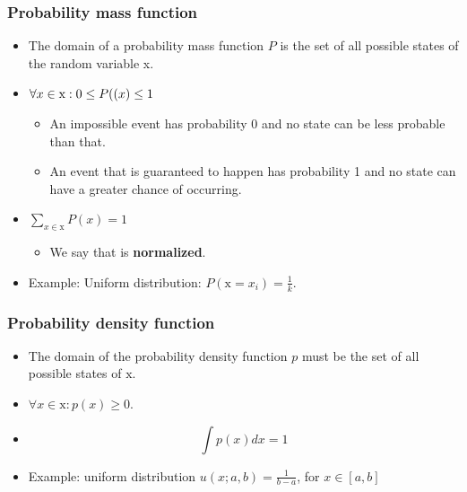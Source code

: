 \documentclass[notes]{beamer}          %
\begin{document}
\begin{frame}
\frametitle{Probability mass function}
\begin{itemize}
    \item The domain of a probability mass function $P$ is the set of all possible states of the random variable x.
    \item $\forall x \in \text{x}: 0 \leq P(\text(x) \leq 1$
        \begin{itemize}
            \item An impossible event has probability 0 and no state can be less probable than that.
            \item An event that is guaranteed to happen has probability 1 and no state can have a greater chance of occurring.
        \end{itemize}
    \item $\sum_{x \in \text{x}} P(x) = 1$
        \begin{itemize}
            \item We say that  is {\bf normalized}.
        \end{itemize}
    \item Example: Uniform distribution: $P(\text{x} = x_i) = \frac{1}{k}$.
\end{itemize}
\end{frame}


\begin{frame}
\frametitle{Probability density function}
\begin{itemize}
    \item The domain of the probability density function $p$ must be the set of all possible states of $\text{x}$.
    \item $\forall x \in \text{x}: p(x)\geq 0.$
    \item $$\int p(x)dx = 1$$
    \item Example: uniform distribution $u(x;a,b) = \frac{1}{b-a}$, for $x \in [a,b]$
\end{itemize}

\end{frame}
\end{document}
